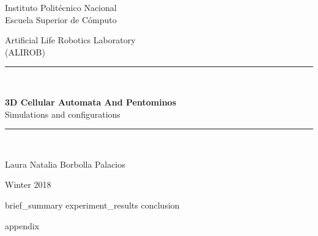 \documentclass[12pt, letterpaper, oneside]{article}
\title{\Title{}}
\author{\Autor{}}
\date{\today}
\newcommand{\Laboratory}{Artificial Life Robotics Laboratory}
\newcommand{\Acronym}{(ALIROB)}
\newcommand{\Title}{3D Cellular Automata And Pentominos}
\newcommand{\Subtitle}{Simulations and configurations}
\newcommand{\Autor}{Laura Natalia Borbolla Palacios}
\newcommand{\Date}{Winter 2018}
\begin{document}
	\begin{titlepage}
		\begin{center}
			\begin{large}
				Instituto Politécnico Nacional\\
				\vspace*{0.2in}
				Escuela Superior de Cómputo\\
				\vspace*{0.6in}
			\end{large}
			\begin{large}
				\Laboratory{}\\
				\Acronym{}\\
				\vspace*{0.8in}
			\end{large}
			\rule{160mm}{0.1mm}\\
			\vspace*{0.1in}
			\begin{Large}
				\textbf{\Title{}} \\
				\vspace*{0.1in}
				\Subtitle{} \\
			\end{Large}
			\vspace*{0.1in}
			\rule{160mm}{0.1mm}\\
			\begin{large}
				\vspace*{0.8in}
				\Autor{} \\
			\end{large}
			\begin{large}
				\vspace*{0.8in}
				\Date{}\\
			\end{large}
		\end{center}
	\end{titlepage}

	\tableofcontents
	\newpage


  {brief_summary}
  {experiment_results}
  {conclusion}
  
  \newpage
  \printbibliography[heading=bibintoc]

  \appendix
  \clearpage
  \addappheadtotoc
  \appendixpage
  {appendix}
\end{document}
